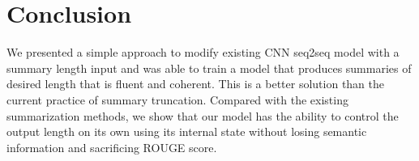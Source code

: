 \section{Conclusion}
\label{sec:conclude}
We presented a simple approach to modify existing CNN seq2seq model with
a summary length input and was able to train a model that produces summaries of
desired length that is fluent and coherent. This is a better solution 
than the current practice of summary truncation. Compared with the existing
summarization methods, we show that our model has the ability to control the
output length on its own using its internal state without losing semantic 
information and sacrificing ROUGE score. 
